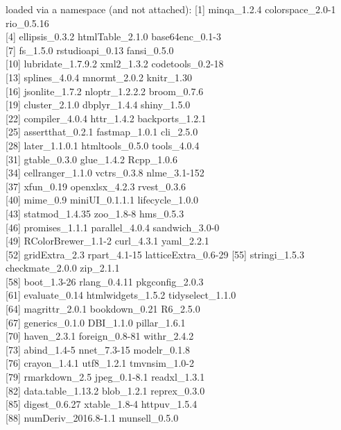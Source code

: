 \documentclass[
  english,
  man, noextraspace]{apa7}
\begin{document}
\begin{appendix}
loaded via a namespace (and not attached): {[}1{]} minqa\_1.2.4
colorspace\_2.0-1 rio\_0.5.16\\
{[}4{]} ellipsis\_0.3.2 htmlTable\_2.1.0 base64enc\_0.1-3\\
{[}7{]} fs\_1.5.0 rstudioapi\_0.13 fansi\_0.5.0\\
{[}10{]} lubridate\_1.7.9.2 xml2\_1.3.2 codetools\_0.2-18\\
{[}13{]} splines\_4.0.4 mnormt\_2.0.2 knitr\_1.30\\
{[}16{]} jsonlite\_1.7.2 nloptr\_1.2.2.2 broom\_0.7.6\\
{[}19{]} cluster\_2.1.0 dbplyr\_1.4.4 shiny\_1.5.0\\
{[}22{]} compiler\_4.0.4 httr\_1.4.2 backports\_1.2.1\\
{[}25{]} assertthat\_0.2.1 fastmap\_1.0.1 cli\_2.5.0\\
{[}28{]} later\_1.1.0.1 htmltools\_0.5.0 tools\_4.0.4\\
{[}31{]} gtable\_0.3.0 glue\_1.4.2 Rcpp\_1.0.6\\
{[}34{]} cellranger\_1.1.0 vctrs\_0.3.8 nlme\_3.1-152\\
{[}37{]} xfun\_0.19 openxlsx\_4.2.3 rvest\_0.3.6\\
{[}40{]} mime\_0.9 miniUI\_0.1.1.1 lifecycle\_1.0.0\\
{[}43{]} statmod\_1.4.35 zoo\_1.8-8 hms\_0.5.3\\
{[}46{]} promises\_1.1.1 parallel\_4.0.4 sandwich\_3.0-0\\
{[}49{]} RColorBrewer\_1.1-2 curl\_4.3.1 yaml\_2.2.1\\
{[}52{]} gridExtra\_2.3 rpart\_4.1-15 latticeExtra\_0.6-29 {[}55{]}
stringi\_1.5.3 checkmate\_2.0.0 zip\_2.1.1\\
{[}58{]} boot\_1.3-26 rlang\_0.4.11 pkgconfig\_2.0.3\\
{[}61{]} evaluate\_0.14 htmlwidgets\_1.5.2 tidyselect\_1.1.0\\
{[}64{]} magrittr\_2.0.1 bookdown\_0.21 R6\_2.5.0\\
{[}67{]} generics\_0.1.0 DBI\_1.1.0 pillar\_1.6.1\\
{[}70{]} haven\_2.3.1 foreign\_0.8-81 withr\_2.4.2\\
{[}73{]} abind\_1.4-5 nnet\_7.3-15 modelr\_0.1.8\\
{[}76{]} crayon\_1.4.1 utf8\_1.2.1 tmvnsim\_1.0-2\\
{[}79{]} rmarkdown\_2.5 jpeg\_0.1-8.1 readxl\_1.3.1\\
{[}82{]} data.table\_1.13.2 blob\_1.2.1 reprex\_0.3.0\\
{[}85{]} digest\_0.6.27 xtable\_1.8-4 httpuv\_1.5.4\\
{[}88{]} numDeriv\_2016.8-1.1 munsell\_0.5.0


\end{appendix}
\end{document}
